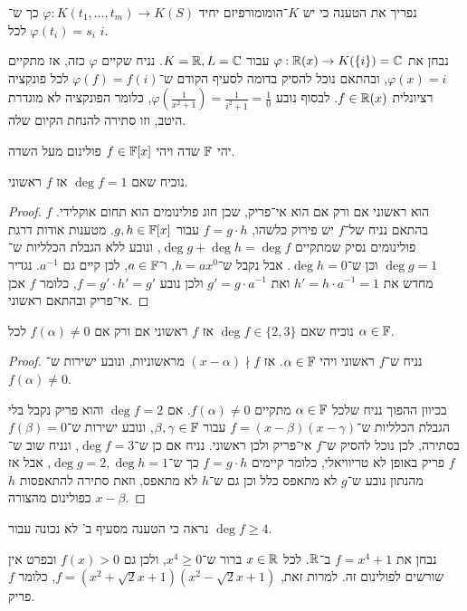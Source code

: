 \subquestion{}
נפריך את הטענה כי יש $K$־הומומורפיזם יחיד $\varphi : K(t_1, \dots, t_m) \to K(S)$ כך ש־$\varphi(t_i) = s_i$ לכל $i$.
\begin{solution}
	נבחן את $\varphi : \mathbb{R}(x) \to K(\{ i \}) = \mathbb{C}$ עבור $K = \mathbb{R}, L = \mathbb{C}$.
	נניח שקיים $\varphi$ כזה, אז מתקיים $\varphi(x) = i$, ובהתאם נוכל להסיק בדומה לסעיף הקודם ש־$\varphi(f) = f(i)$ לכל פונקציה רציונלית $f \in \mathbb{R}(x)$.
	לבסוף נובע $\varphi(\frac{1}{x^2 + 1}) = \frac{1}{i^2 + 1} = \frac{1}{0}$, כלומר הפונקציה לא מוגדרת היטב, וזו סתירה להנחת הקיום שלה.
\end{solution}

\question{}
יהי $\mathbb{F}$ שדה ויהי $f \in \mathbb{F}[x]$ פולינום מעל השדה.

\subquestion{}
נוכיח שאם $\deg f = 1$ אז $f$ ראשוני.
\begin{proof}
	$f$ הוא ראשוני אם ורק אם הוא אי־פריק, שכן חוג פולינומים הוא תחום אוקלידי.
	בהתאם נניח של־$f$ יש פירוק כלשהו, $f = g \cdot h$ עבור $g, h \in \mathbb{F}[x]$.
	מטענות אודות דרגת פולינומים נסיק שמתקיים $\deg g + \deg h = \deg f$, ונובע ללא הגבלת הכלליות ש־$\deg g = 1$ וכן ש־$\deg h = 0$.
	אבל נקבל ש־$h = a x^0$, ו־$a \in \mathbb{F}$, לכן קיים גם $a^{-1}$.
	נגדיר מחדש את $h' = h \cdot a^{-1} = 1$ ואת $g' = g \cdot a^{-1}$ ולכן נובע $f = g' \cdot h' = g'$, כלומר $f$ אכן אי־פריק ובהתאם ראשוני.
\end{proof}

\subquestion{}
נוכיח שאם $\deg f \in \{2, 3\}$ אז $f$ ראשוני אם ורק אם $f(\alpha) \ne 0$ לכל $\alpha \in \mathbb{F}$.
\begin{proof}
	נניח ש־$f$ ראשוני ויהי $\alpha \in \mathbb{F}$.
	אז $(x - \alpha) \nmid f$ מראשוניות, ונובע ישירות ש־$f(\alpha) \ne 0$.

	בכיוון ההפוך נניח שלכל $\alpha \in \mathbb{F}$ מתקיים $f(\alpha) \ne 0$.
	אם $\deg f = 2$ והוא פריק נקבל בלי הגבלת הכלליות ש־$f = (x - \beta)(x - \gamma)$ עבור $\beta, \gamma \in \mathbb{F}$, ונובע ישירות ש־$f(\beta) = 0$ בסתירה, לכן נוכל להסיק ש־$f$ אי־פריק ולכן ראשוני.
	נניח אם כן ש־$\deg f = 3$, ונניח שוב ש־$f$ פריק באופן לא טריוויאלי, כלומר קיימים $f = g \cdot h$ כך ש־$\deg g = 2, \deg h = 1$,
	אבל אז מהנתון נובע ש־$g$ לא מתאפס כלל וכן גם ש־$h$ לא מתאפס, וזאת סתירה להתאפסות $h$ כפולינום מהצורה $x - \beta$.
\end{proof}

\subquestion{}
נראה כי הטענה מסעיף ב' לא נכונה עבור $\deg f \ge 4$.
\begin{solution}
	נבחן את $f = x^4 + 1$ ב־$\mathbb{R}$.
	לכל $x \in \mathbb{R}$ ברור ש־$x^4 \ge 0$, ולכן גם $f(x) > 0$ ובפרט אין שורשים לפולינום זה.
	למרות זאת, $f = (x^2 + \sqrt{2}x + 1)(x^2 - \sqrt{2}x + 1)$, כלומר $f$ פריק.
\end{solution}

